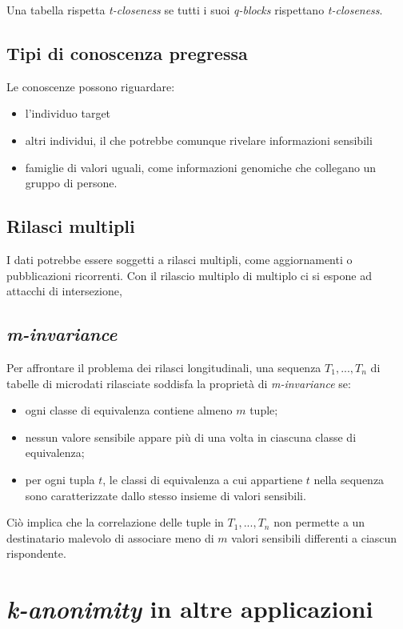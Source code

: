 \documentclass{report}
\begin{document}
Una tabella rispetta \textit{t-closeness} se tutti i suoi \textit{q-blocks}
rispettano \textit{t-closeness}.

\subsection{Tipi di conoscenza pregressa}
Le conoscenze possono riguardare:
\begin{itemize}
    \item l'individuo target
    \item altri individui, il che potrebbe comunque rivelare informazioni sensibili
    \item famiglie di valori uguali, come informazioni genomiche che collegano un gruppo di persone.
\end{itemize}

\subsection{Rilasci multipli}
I dati potrebbe essere soggetti a rilasci multipli, come aggiornamenti o pubblicazioni 
ricorrenti.
Con il rilascio multiplo di multiplo ci si espone ad attacchi di intersezione, 

\subsection{\textit{m-invariance}}
Per affrontare il problema dei rilasci longitudinali, una sequenza $T_1, ..., T_n$ di tabelle di microdati rilasciate soddisfa la proprietà di \textit{m-invariance} se:

\begin{itemize}
    \item ogni classe di equivalenza contiene almeno $m$ tuple;
    \item nessun valore sensibile appare più di una volta in ciascuna classe di equivalenza;
    \item per ogni tupla $t$, le classi di equivalenza a cui appartiene $t$ nella sequenza sono caratterizzate dallo stesso insieme di valori sensibili.
\end{itemize}

\noindent Ciò implica che la correlazione delle tuple in $T_1, ..., T_n$ non permette a un destinatario malevolo di associare meno di $m$ valori sensibili differenti a ciascun rispondente.

\section{\textit{k-anonimity} in altre applicazioni}
\end{document}
